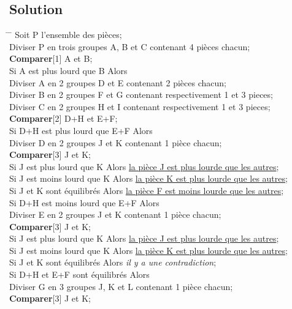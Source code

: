 \documentclass{article}
\begin{document}
\subsection{Solution}
\begin{tabbing}
\hspace{1cm}\=\kill
\>\hspace{1cm}\=\kill
Soit P l'ensemble des pièces;\\
Diviser P en trois groupes A, B et C contenant 4 pièces chacun;\\
{\bf Comparer}[1] A et B;\\
Si A est plus lourd que B Alors\\
\> Diviser A en 2 groupes D et E contenant 2 pièces chacun;\\
\> Diviser B en 2 groupes F et G contenant respectivement 1 et 3 pieces;\\
\> Diviser C en 2 groupes H et I contenant respectivement 1 et 3 pieces;\\
\> {\bf Comparer}[2] D+H et E+F;\\
\> Si D+H est plus lourd que E+F Alors\\
\>\> Diviser D en 2 groupes J et K contenant 1 pièce chacun;\\
\>\> {\bf Comparer}[3] J et K;\\
\>\> Si J est plus lourd que K Alors \underline{la pièce J est plus lourde que les autres};\\
\>\> Si J est moins lourd que K Alors \underline{la pièce K est plus lourde que les autres};\\
\>\> Si J et K sont équilibrés Alors \underline{la pièce F est moins lourde que les autres};\\
\> Si D+H est moins lourd que E+F Alors\\
\>\> Diviser E en 2 groupes J et K contenant 1 pièce chacun;\\
\>\> {\bf Comparer}[3] J et K;\\
\>\> Si J est plus lourd que K Alors \underline{la pièce J est plus lourde que les autres};\\
\>\> Si J est moins lourd que K Alors \underline{la pièce K est plus lourde que les autres};\\
\>\> Si J et K sont équilibrés Alors {\em il y a une contradiction};\\
\> Si D+H et E+F sont équilibrés Alors\\
\>\> Diviser G en 3 groupes J, K et L contenant 1 pièce chacun;\\
\>\> {\bf Comparer}[3] J et K;\\

\end{tabbing}
\end{document}
